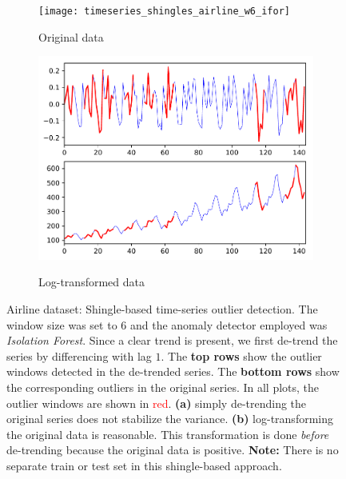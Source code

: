 \documentclass{article} %
\begin{document}
\begin{figure}
	\centering
	\captionsetup{labelformat=empty}
	\begin{subfigure}[b]{0.45\textwidth}
		\texttt{[image: timeseries\_shingles\_airline\_w6\_ifor]}
		\label{fig:airline}
		\caption{Original data}
	\end{subfigure}
	\begin{subfigure}[b]{0.45\textwidth}
		\includegraphics[width=\textwidth, clip=true, trim=0mm 0mm 0mm 0mm]{timeseries_shingles_airline_w6_log_ifor}
		\label{fig:airline_log}
		\caption{Log-transformed data}
	\end{subfigure}
	\caption{Airline dataset: Shingle-based time-series outlier detection. The window size was set to $6$ and the anomaly detector employed was \textit{Isolation Forest}. Since a clear trend is present, we first de-trend the series by differencing with lag $1$. The \textbf{top rows} show the outlier windows detected in the de-trended series. The \textbf{bottom rows} show the corresponding outliers in the original series. In all plots, the outlier windows are shown in \textcolor{red}{red}. {\bf (a)} simply de-trending the original series does not stabilize the variance. {\bf (b)} log-transforming the original data is reasonable. This transformation is done {\em before} de-trending because the original data is positive. \textbf{Note:} There is no separate train or test set in this shingle-based approach.}
	\label{fig:shingles_airline}
\end{figure}
\end{document}
